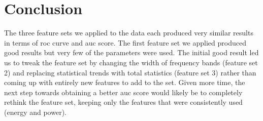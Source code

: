 \documentclass[10pt, conference, compsocconf]{IEEEtran}
\begin{document}
\section{Conclusion}
The three feature sets we applied to the data each produced very similar results
in terms of roc curve and auc score. The first feature set we applied produced
good results but very few of the parameters were used. The initial good result
led us to tweak the feature set by changing the width of frequency bands
(feature set 2) and replacing statistical trends with total statistics (feature
set 3) rather than coming up with entirely new features to add to the set. Given
more time, the next step towards obtaining a better auc score would likely be to
completely rethink the feature set, keeping only the features that were
consistently used (energy and power). 

\nocite{*}

 
\end{document}
